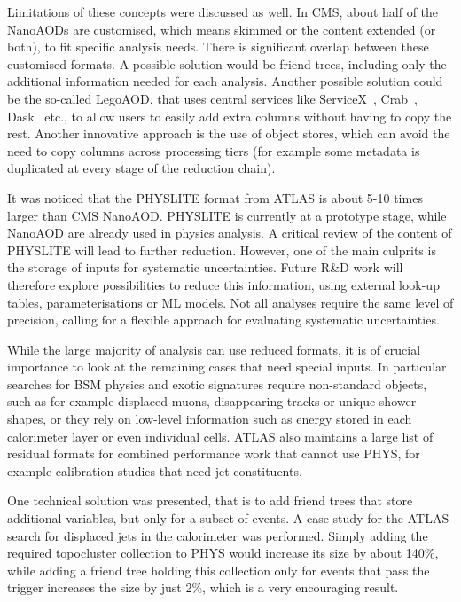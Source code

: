\documentclass[a4paper,11pt]{article}
\begin{document}
Limitations of these concepts were discussed as well. In CMS, about half
of the NanoAODs are customised, which means skimmed or the content
extended (or both), to fit specific analysis needs. There is significant
overlap between these customised formats. A possible solution would be
friend trees, including only the additional information needed for each
analysis. Another possible solution could be the so-called LegoAOD, that
uses central services like ServiceX~\cite{galewsky2020servicex}, Crab~\cite{SPIGA2008267}, 
Dask~\cite{dask} etc., to allow users to
easily add extra columns without having to copy the rest. Another
innovative approach is the use of object stores, which can avoid the
need to copy columns across processing tiers (for example some metadata
is duplicated at every stage of the reduction chain).

It was noticed that the PHYSLITE format from ATLAS is about 5-10 times
larger than CMS NanoAOD. PHYSLITE is currently at a prototype stage,
while NanoAOD are already used in physics analysis. A critical review of
the content of PHYSLITE will lead to further reduction. However, one of
the main culprits is the storage of inputs for systematic uncertainties.
Future R\&D work will therefore explore possibilities to reduce this
information, using external look-up tables, parameterisations or ML
models. Not all analyses require the same level of precision, calling
for a flexible approach for evaluating systematic uncertainties.

While the large majority of analysis can use reduced formats, it is of
crucial importance to look at the remaining cases that need special
inputs. In particular searches for BSM physics and exotic signatures
require non-standard objects, such as for example displaced muons,
disappearing tracks or unique shower shapes, or they rely on low-level
information such as energy stored in each calorimeter layer or even
individual cells. ATLAS also maintains a large list of residual formats
for combined performance work that cannot use PHYS, for example
calibration studies that need jet constituents.

One technical solution was presented, that is to add friend trees that
store additional variables, but only for a subset of events. A case
study for the ATLAS search for displaced jets in the calorimeter was
performed. Simply adding the required topocluster collection to PHYS
would increase its size by about 140\%, while adding a friend tree
holding this collection only for events that pass the trigger increases
the size by just 2\%, which is a very encouraging result.
\end{document}
